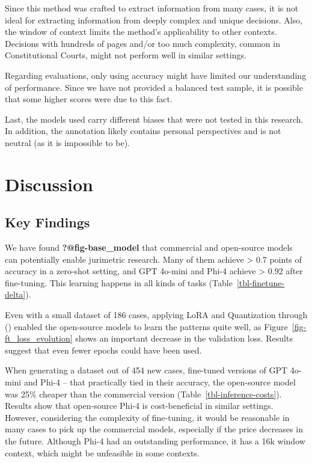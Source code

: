 \documentclass[
  12pt,
]{article}
\begin{document}
Since this method was crafted to extract information from many cases, it
is not ideal for extracting information from deeply complex and unique
decisions. Also, the window of context limits the method's applicability
to other contexts. Decisions with hundreds of pages and/or too much
complexity, common in Constitutional Courts, might not perform well in
similar settings.

Regarding evaluations, only using accuracy might have limited our
understanding of performance. Since we have not provided a balanced test
sample, it is possible that some higher scores were due to this fact.

Last, the models used carry different biases that were not tested in
this research. In addition, the annotation likely contains personal
perspectives and is not neutral (as it is impossible to be).

\section{Discussion}\label{sec-discussion}

\subsection{Key Findings}\label{sec-key-findinds}

We have found \textbf{?@fig-base\_model} that commercial and open-source
models can potentially enable jurimetric research. Many of them achieve
\textgreater{} 0.7 points of accuracy in a zero-shot setting, and GPT
4o-mini and Phi-4 achieve \textgreater{} 0.92 after fine-tuning. This
learning happens in all kinds of tasks (Table~\ref{tbl-finetune-delta}).

Even with a small dataset of 186 cases, applying LoRA and Quantization
through () enabled the
open-source models to learn the patterns quite well, as
Figure~\ref{fig-ft_loss_evolution} shows an important decrease in the
validation loss. Results suggest that even fewer epochs could have been
used.

When generating a dataset out of 454 new cases, fine-tuned versions of
GPT 4o-mini and Phi-4 -- that practically tied in their accuracy, the
open-source model was 25\% cheaper than the commercial version
(Table~\ref{tbl-inference-costs}). Results show that open-source Phi-4
is cost-beneficial in similar settings. However, considering the
complexity of fine-tuning, it would be reasonable in many cases to pick
up the commercial models, especially if the price decreases in the
future. Although Phi-4 had an outstanding performance, it has a 16k
window context, which might be unfeasible in some contexts.
\end{document}
